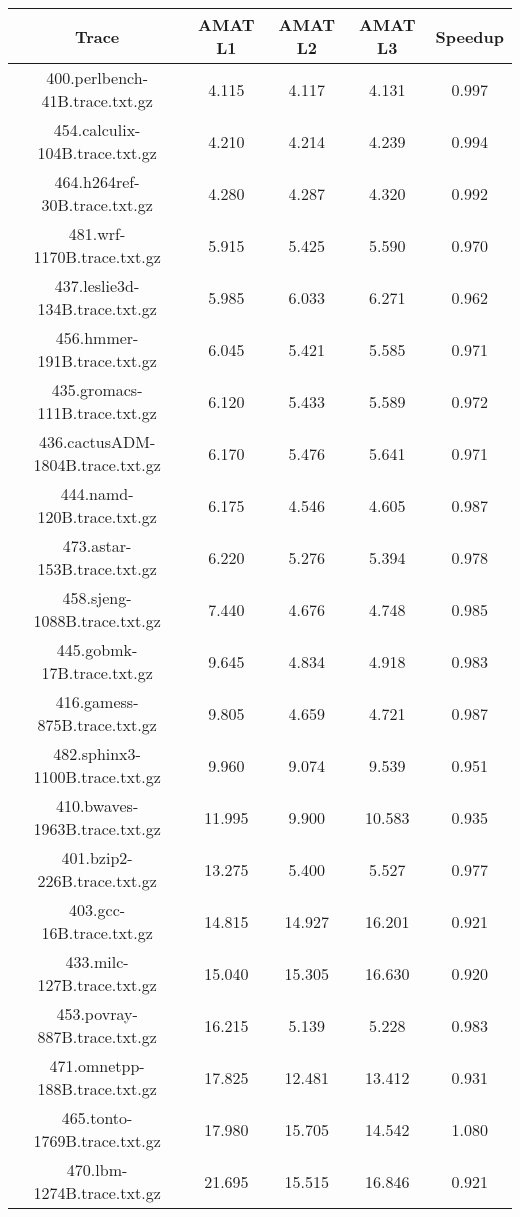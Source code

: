 \begin{table}[H]
\centering
\begin{tabular}{|c|c|c|c|c|}
\hline
Trace & AMAT L1 & AMAT L2 & AMAT L3 & Speedup\\
\hline
400.perlbench-41B.trace.txt.gz & 4.115 & 4.117 &  4.131 & 0.997\\\hline
454.calculix-104B.trace.txt.gz & 4.210 & 4.214 &  4.239 & 0.994\\\hline
464.h264ref-30B.trace.txt.gz & 4.280 & 4.287 &  4.320 & 0.992\\\hline
481.wrf-1170B.trace.txt.gz & 5.915 & 5.425 &  5.590 & 0.970\\\hline
437.leslie3d-134B.trace.txt.gz & 5.985 & 6.033 &  6.271 & 0.962\\\hline
456.hmmer-191B.trace.txt.gz & 6.045 & 5.421 &  5.585 & 0.971\\\hline
435.gromacs-111B.trace.txt.gz & 6.120 & 5.433 &  5.589 & 0.972\\\hline
436.cactusADM-1804B.trace.txt.gz & 6.170 & 5.476 &  5.641 & 0.971\\\hline
444.namd-120B.trace.txt.gz & 6.175 & 4.546 &  4.605 & 0.987\\\hline
473.astar-153B.trace.txt.gz & 6.220 & 5.276 &  5.394 & 0.978\\\hline
458.sjeng-1088B.trace.txt.gz & 7.440 & 4.676 &  4.748 & 0.985\\\hline
445.gobmk-17B.trace.txt.gz & 9.645 & 4.834 &  4.918 & 0.983\\\hline
416.gamess-875B.trace.txt.gz & 9.805 & 4.659 &  4.721 & 0.987\\\hline
482.sphinx3-1100B.trace.txt.gz & 9.960 & 9.074 &  9.539 & 0.951\\\hline
410.bwaves-1963B.trace.txt.gz & 11.995 & 9.900 &  10.583 & 0.935\\\hline
401.bzip2-226B.trace.txt.gz & 13.275 & 5.400 &  5.527 & 0.977\\\hline
403.gcc-16B.trace.txt.gz & 14.815 & 14.927 &  16.201 & 0.921\\\hline
433.milc-127B.trace.txt.gz & 15.040 & 15.305 &  16.630 & 0.920\\\hline
453.povray-887B.trace.txt.gz & 16.215 & 5.139 &  5.228 & 0.983\\\hline
471.omnetpp-188B.trace.txt.gz & 17.825 & 12.481 &  13.412 & 0.931\\\hline
465.tonto-1769B.trace.txt.gz & 17.980 & 15.705 &  14.542 & 1.080\\\hline
470.lbm-1274B.trace.txt.gz & 21.695 & 15.515 &  16.846 & 0.921\\\hline

\end{tabular}
\end{table}
